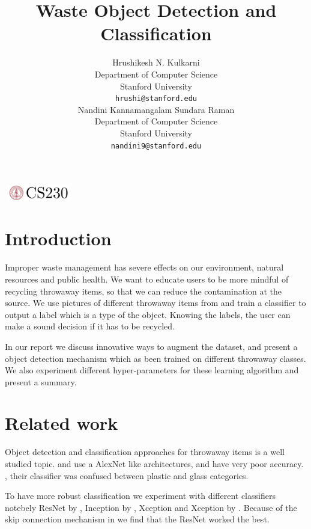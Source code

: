 \documentclass{article}
\title{Waste Object Detection and Classification}
\author{
 Hrushikesh N. Kulkarni\\
  Department of Computer Science\\
  Stanford University\\
  \texttt{hrushi@stanford.edu} \\
  \And
  Nandini Kannamangalam Sundara Raman\\
  Department of Computer Science\\
  Stanford University\\
  \texttt{nandini9@stanford.edu} \\
}
\begin{document}

\begin{center}
\includegraphics[width=3cm, height=0.7cm]{CS230}
\end{center}

\maketitle

\begin{abstract}

\end{abstract}

\section{Introduction}	
Improper waste management has severe effects on our environment, natural resources and public health. We want to educate users to be more mindful of recycling throwaway items, so that we can reduce the contamination at the source. We use pictures of different throwaway items from \cite{yang2016classification} and train a classifier to output a label which is a type of the object. Knowing the labels, the user can make a sound decision if it has to be recycled. 

In our report we discuss innovative ways to augment the dataset, and present a object detection mechanism which as been trained on different throwaway classes. We also experiment different hyper-parameters for these learning algorithm and present a summary.

\section{Related work}

Object detection and classification approaches for throwaway items is a well studied topic. \citeauthor{yang2016classification} and \citeauthor{chu2018multilayer} use a AlexNet \cite{krizhevsky2012imagenet} like architectures, and have very poor accuracy. \cite{yang2016classification}, their classifier was confused between plastic and glass categories. 

To have more robust classification we experiment with different classifiers notebely ResNet by \citeauthor{he2016deep}, Inception by \citeauthor{szegedy2017inception}, Xception and Xception by \citeauthor{chollet2017xception}. Because of the skip connection mechanism in \cite{he2016deep} we find that the ResNet worked the best. 
\end{document}
